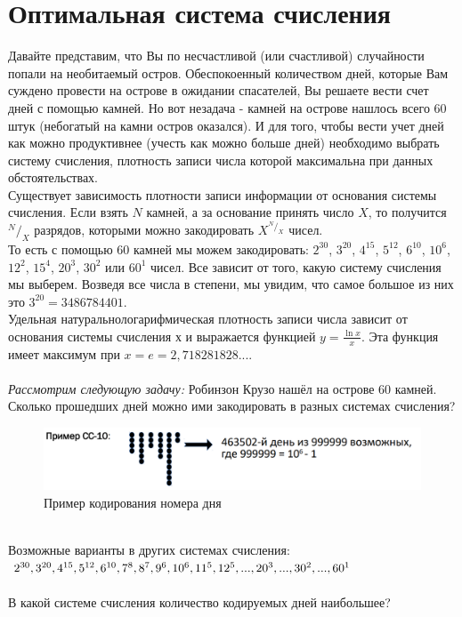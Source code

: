 \section{Оптимальная система счисления}
Давайте представим, что Вы по несчастливой (или счастливой) случайности попали на необитаемый остров. Обеспокоенный количеством дней, которые Вам суждено провести на острове в ожидании спасателей, Вы решаете вести счет дней с помощью камней. Но вот незадача - камней на острове нашлось всего 60 штук (небогатый на камни остров оказался). И для того, чтобы вести учет дней как можно продуктивнее (учесть как можно больше дней) необходимо выбрать систему счисления, плотность записи числа которой максимальна при данных обстоятельствах.
\\Существует зависимость плотности записи информации от основания системы счисления. Если взять $N$ камней, а за основание принять число $X$, то получится $^N/_X$ разрядов, которыми можно закодировать $X^{^N/_X}$ чисел.
\\То есть с помощью 60 камней мы можем закодировать: $2^{30}$, $3^{20}$, $4^{15}$, $5^{12}$, $6^{10}$, $10^{6}$, $12^{2}$, $15^{4}$, $20^{3}$, $30^{2}$ или $60^1$ чисел. Все зависит от того, какую систему счисления мы выберем. Возведя все числа в степени, мы увидим, что самое большое из них это $3^{20} = 3486784401$.
\\Удельная натуральнологарифмическая плотность записи числа зависит от основания системы счисления $х$ и выражается функцией $y = \frac{\ln{x}}{x}$. Эта функция имеет максимум при $x = e = 2,718281828...$.\\
\\\emph{Рассмотрим следующую задачу:} Робинзон Крузо нашёл на острове 60 камней. Сколько прошедших дней можно ими закодировать в разных системах счисления?
\begin{figure}[h]
\centering
\includegraphics[width=12cm]{images/1_2_3(10CC)}
\caption{Пример кодирования номера дня}
\end{figure}
\\Возможные варианты в других системах счисления:
$2^{30}, 3^{20}, 4^{15}, 5^{12}, 6^{10}, 7^{8},\\ 8^7, 9^6, 10^6, 11^5, 12^5, ..., 20^3, ..., 30^2, ..., 60^1$
\\\\В какой системе счисления количество кодируемых дней наибольшее?
